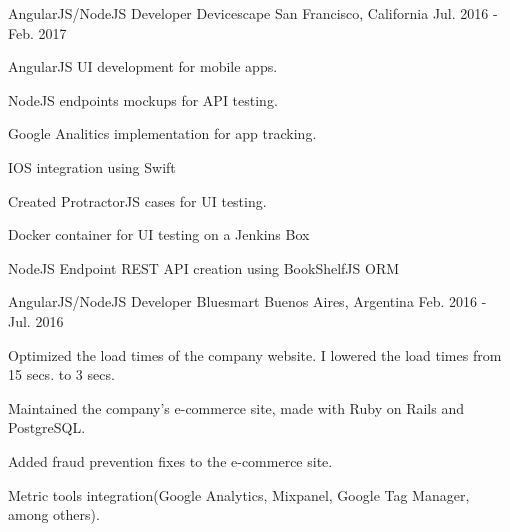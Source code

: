 \begin{cventries}
    \cventry
    {AngularJS/NodeJS Developer} %
    {Devicescape} %
    {San Francisco, California} %
    {Jul. 2016 - Feb. 2017} %
    {
    \begin{cvitems} %
        \item {AngularJS UI development for mobile apps.}
        \item {NodeJS endpoints mockups for API testing.}
        \item {Google Analitics implementation for app tracking.}
        \item {IOS integration using Swift}
        \item {Created ProtractorJS cases for UI testing.}
        \item {Docker container for UI testing on a Jenkins Box}
        \item {NodeJS Endpoint REST API creation using BookShelfJS ORM}
    \end{cvitems}
    }


    \cventry
    {AngularJS/NodeJS Developer} %
    {Bluesmart} %
    {Buenos Aires, Argentina} %
    {Feb. 2016 - Jul. 2016} %
    {
    \begin{cvitems} %
        \item {Optimized the load times of the company website. I lowered the load times from 15 secs. to 3 secs.}
        \item {Maintained the company's e-commerce site, made with Ruby on Rails and PostgreSQL.}
        \item {Added fraud prevention fixes to the e-commerce site.}
        \item {Metric tools integration(Google Analytics, Mixpanel, Google Tag Manager, among others).}
    \end{cvitems}
    }


\end{cventries}
